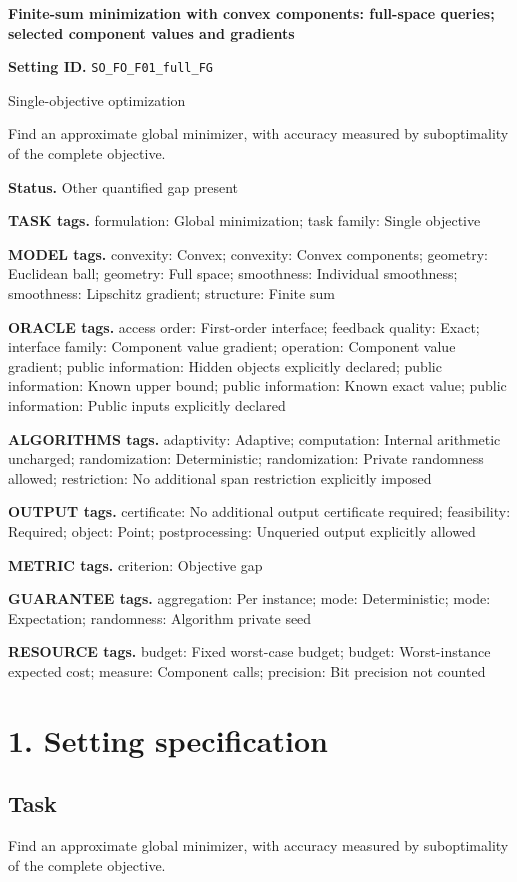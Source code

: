 \documentclass[10pt,a4paper]{article}
\begin{document}
\raggedright

{\LARGE\bfseries\sffamily\color{AtlasNavy} Finite-sum minimization with convex components: full-space queries; selected component values and gradients\par}\vspace{5pt}
\textbf{Setting ID.} \texttt{SO\_\allowbreak{}FO\_\allowbreak{}F01\_\allowbreak{}full\_\allowbreak{}FG}

Single-objective optimization

Find an approximate global minimizer, with accuracy measured by suboptimality of the complete objective.

\textbf{Status.} Other quantified gap present

\textbf{TASK tags.} formulation: Global minimization; task family: Single objective

\textbf{MODEL tags.} convexity: Convex; convexity: Convex components; geometry: Euclidean ball; geometry: Full space; smoothness: Individual smoothness; smoothness: Lipschitz gradient; structure: Finite sum

\textbf{ORACLE tags.} access order: First-order interface; feedback quality: Exact; interface family: Component value gradient; operation: Component value gradient; public information: Hidden objects explicitly declared; public information: Known upper bound; public information: Known exact value; public information: Public inputs explicitly declared

\textbf{ALGORITHMS tags.} adaptivity: Adaptive; computation: Internal arithmetic uncharged; randomization: Deterministic; randomization: Private randomness allowed; restriction: No additional span restriction explicitly imposed

\textbf{OUTPUT tags.} certificate: No additional output certificate required; feasibility: Required; object: Point; postprocessing: Unqueried output explicitly allowed

\textbf{METRIC tags.} criterion: Objective gap

\textbf{GUARANTEE tags.} aggregation: Per instance; mode: Deterministic; mode: Expectation; randomness: Algorithm private seed

\textbf{RESOURCE tags.} budget: Fixed worst-case budget; budget: Worst-instance expected cost; measure: Component calls; precision: Bit precision not counted

\section{1. Setting specification}
\subsection{Task}
Find an approximate global minimizer, with accuracy measured by suboptimality of the complete objective.
\end{document}
